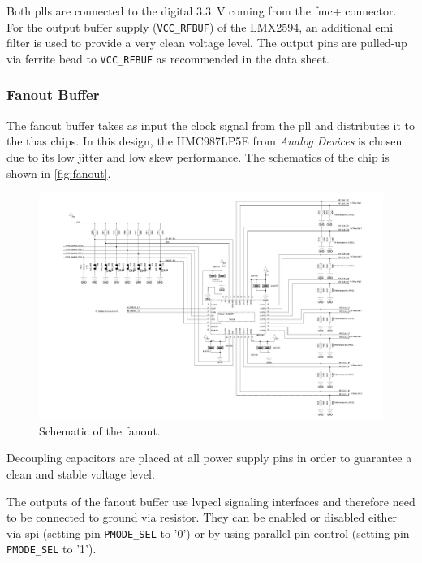 Both \glspl{pll} are connected to the digital \SI{3.3}{\volt} coming from the \gls{fmc}+ connector.
For the output buffer supply (\texttt{VCC\_RFBUF}) of the LMX2594, an additional \gls{emi} filter is used to provide a very clean voltage level.
The output pins are pulled-up via ferrite bead to \texttt{VCC\_RFBUF} as recommended in the data sheet.

\subsubsection*{Fanout Buffer}
The fanout buffer takes as input the clock signal from the \gls{pll} and distributes it to the \glspl{tha} chips.
In this design, the HMC987LP5E from \textit{Analog Devices} is chosen due to its low jitter and low skew performance. 
The schematics of the chip is shown in \autoref{fig:fanout}.

\begin{figure}[tbh]
	\centering
	\includegraphics[width = \textwidth]{chap/04-work/img/fanout}
	\caption{Schematic of the fanout.}
	\label{fig:fanout}
\end{figure}
Decoupling capacitors are placed at all power supply pins in order to guarantee a clean and stable voltage level.

The outputs of the fanout buffer use \gls{lvpecl} signaling interfaces and therefore need to be connected to ground via resistor.
They can be enabled or disabled either via \gls{spi} (setting pin \texttt{PMODE\_SEL} to '0') or by using parallel pin control (setting pin \texttt{PMODE\_SEL} to '1'). 

